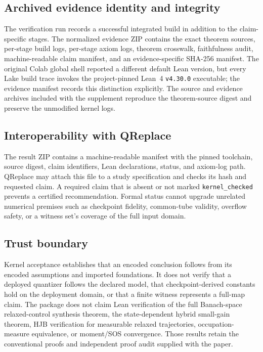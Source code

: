 \documentclass[twoside,11pt]{article}
\begin{document}
\subsection{Archived evidence identity and integrity}
\label{app:lean-evidence}

The verification run %
records a successful
integrated build in addition to the claim-specific stages.  The normalized
evidence ZIP contains the exact theorem sources, per-stage build logs,
per-stage axiom logs, theorem crosswalk, faithfulness audit, machine-readable
claim manifest, and an evidence-specific SHA-256 manifest.  The original Colab
global shell reported a different default Lean version, but every Lake build
trace invokes the project-pinned Lean~4 \texttt{v4.30.0} executable; the
evidence manifest records this distinction explicitly.  The source and evidence
archives included with the supplement reproduce the theorem-source digest and
preserve the unmodified kernel logs.

\subsection{Interoperability with QReplace}
\label{app:lean-qreplace-bridge}

The result ZIP contains a machine-readable manifest with the pinned toolchain,
source digest, claim identifiers, Lean declarations, status, and axiom-log
path.  QReplace may attach this file to a study specification and checks its
hash and requested claim.  A required claim that is absent or not marked
\texttt{kernel\_checked} prevents a certified recommendation.  Formal status
cannot upgrade unrelated numerical premises such as checkpoint fidelity,
common-tube validity, overflow safety, or a witness set's coverage of the full
input domain.

\subsection{Trust boundary}
\label{app:lean-trust}

Kernel acceptance establishes that an encoded conclusion follows from its
encoded assumptions and imported foundations.  It does not verify that a
deployed quantizer follows the declared model, that checkpoint-derived
constants hold on the deployment domain, or that a finite witness represents
a full-map claim.  The package does not claim Lean verification of the full
Banach-space relaxed-control synthesis theorem, the state-dependent hybrid
small-gain theorem, HJB verification for measurable relaxed trajectories,
occupation-measure equivalence, or moment/SOS convergence.  Those results
retain the conventional proofs and independent proof audit supplied with the
paper.


\FloatBarrier

\end{document}
